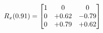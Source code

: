\documentclass[preview]{standalone}
\begin{document}
\begin{align*}
\special{dvisvgm:raw <g id='unique000'>}R_{x}(0.91) = \begin{bmatrix}1 & 0 & 0 \\0 & +0.62 & -0.79 \\0 & +0.79 & +0.62\end{bmatrix}\special{dvisvgm:raw </g>}
\end{align*}
\end{document}
